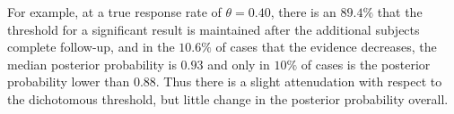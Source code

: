 \documentclass[12pt]{article}
\begin{document}
For example, at a true response rate of $\theta=0.40$, there is an $89.4\%$ that the threshold for a significant result is maintained after the additional subjects complete follow-up, and in the $10.6\%$ of cases that the evidence decreases, the median posterior probability is $0.93$ and only in $10\%$ of cases is the posterior probability lower than $0.88$. Thus there is a slight attenudation with respect to the dichotomous threshold, but little change in the posterior probability overall.

\end{document}
